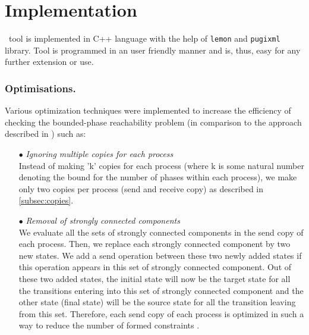 \section{Implementation}

\MPass\ tool is implemented in C++ language with the help of {\tt lemon} and {\tt pugixml} library.
Tool is programmed in an user friendly manner and is, thus, easy for any further extension or use.

\subsubsection{Optimisations.}

Various optimization techniques were implemented to increase the efficiency of checking the bounded-phase reachability problem (in comparison  to the approach described in  \cite{AAC13}) such as:

\begin{itemize}
\item[$\bullet$] \emph{Ignoring multiple copies for each process}\\
Instead of making 'k' copies for each process (where k is some natural 
number denoting the bound for the number of phases within each process), 
we make only two copies per process (send and receive copy) as described in \cref{subsec:copies}.
\item[$\bullet$] \emph{Removal of strongly connected components}\\
We evaluate all the sets of strongly connected components in the send copy of each process. 
Then, we replace  each strongly connected component  by   two new states. We add a send operation between these two newly added states if this operation appears in this set of strongly connected component.  Out of these two added states, the initial state will now be the target state for  all the transitions entering into this set of strongly connected component  and the other state (final state) will be 
the source state for all the transition leaving from this set. Therefore, each send copy of each 
process is optimized in such a way to reduce the number of formed constraints .
\end{itemize}